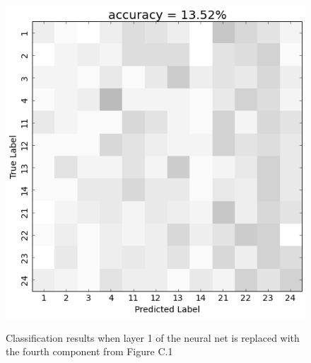 \begin{figure}[htbp] 
  \begin{center}
    \includegraphics[scale=0.5]{Figures/PC3_confusion}
   \\\vspace{-0.8em}
    \caption{Classification results when layer 1 of the neural net is replaced with the fourth component from Figure C.1}
    \label{fig:PC3_confusion}
  \end{center}
  \vspace{-1em}
\end{figure}